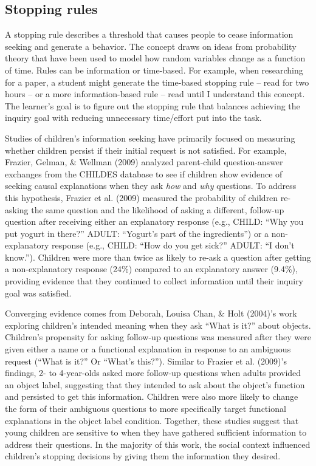 \documentclass[oneside]{report}
\begin{document}
\hypertarget{stopping-rules}{%
\subsection{Stopping rules}\label{stopping-rules}}

A stopping rule describes a threshold that causes people to cease
information seeking and generate a behavior. The concept draws on ideas
from probability theory that have been used to model how random
variables change as a function of time. Rules can be information or
time-based. For example, when researching for a paper, a student might
generate the time-based stopping rule -- read for two hours -- or a more
information-based rule -- read until I understand this concept. The
learner's goal is to figure out the stopping rule that balances
achieving the inquiry goal with reducing unnecessary time/effort put
into the task.

Studies of children's information seeking have primarily focused on
measuring whether children persist if their initial request is not
satisfied. For example, Frazier, Gelman, \& Wellman (2009) analyzed
parent-child question-answer exchanges from the CHILDES database to see
if children show evidence of seeking causal explanations when they ask
\emph{how} and \emph{why} questions. To address this hypothesis, Frazier
et al. (2009) measured the probability of children re-asking the same
question and the likelihood of asking a different, follow-up question
after receiving either an explanatory response (e.g., CHILD: ``Why you
put yogurt in there?'' ADULT: ``Yogurt's part of the ingredients'') or a
non-explanatory response (e.g., CHILD: ``How do you get sick?'' ADULT:
``I don't know.''). Children were more than twice as likely to re-ask a
question after getting a non-explanatory response (24\%) compared to an
explanatory answer (9.4\%), providing evidence that they continued to
collect information until their inquiry goal was satisfied.

Converging evidence comes from Deborah, Louisa Chan, \& Holt (2004)'s
work exploring children's intended meaning when they ask ``What is it?''
about objects. Children's propensity for asking follow-up questions was
measured after they were given either a name or a functional explanation
in response to an ambiguous request (``What is it?'' Or ``What's
this?''). Similar to Frazier et al. (2009)'s findings, 2- to 4-year-olds
asked more follow-up questions when adults provided an object label,
suggesting that they intended to ask about the object's function and
persisted to get this information. Children were also more likely to
change the form of their ambiguous questions to more specifically target
functional explanations in the object label condition. Together, these
studies suggest that young children are sensitive to when they have
gathered sufficient information to address their questions. In the
majority of this work, the social context influenced children's stopping
decisions by giving them the information they desired.
\end{document}
